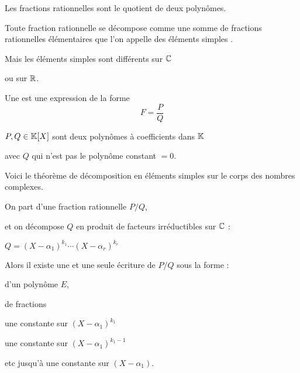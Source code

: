 






\debuttexte

\diapo

\change

Les fractions rationnelles sont le quotient de deux polynômes.

\change


Toute fraction rationnelle se décompose comme une somme de fractions rationnelles
élémentaires que l'on appelle des \og éléments simples \fg. 

\change

Mais les éléments simples 
sont différents sur $\mathbb{C}$ 

\change

ou sur $\mathbb{R}$.


\diapo

Une  est une expression
de la forme
$$F=\frac{P}{Q}$$


$P,Q \in \mathbb{K}[X]$ sont deux polynômes à coefficients dans $\mathbb{K}$

avec $Q$ qui n'est pas le polynôme constant $=0$.

 




\diapo

Voici le théorème de décomposition en éléments simples sur le corps des nombres complexes.


On part d'une fraction rationnelle $P/Q$,

et on décompose $Q$ en produit de facteurs irréductibles sur $\mathbb{C}$ :

$Q=(X-\alpha_1)^{k_1}\cdots(X-\alpha_r)^{k_r}$

\change

Alors il existe une et une seule écriture de $P/Q$ sous la forme :

d'un polynôme $E$,

de fractions 

une constante sur $(X-\alpha_1)^{k_1}$

une constante sur $(X-\alpha_1)^{k_1-1}$

etc jusqu'à une constante sur $(X-\alpha_1)$.

